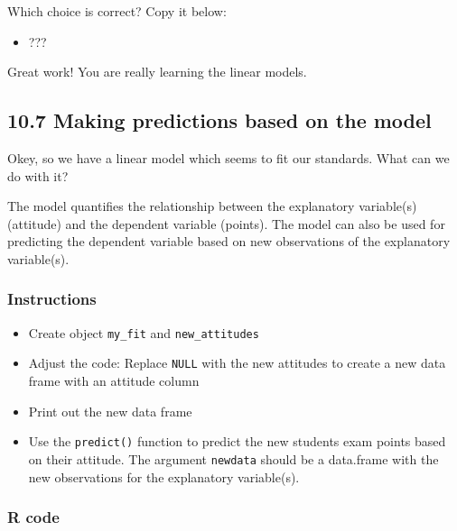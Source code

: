 \documentclass[]{article}
\providecommand{\tightlist}{%
  \setlength{\itemsep}{0pt}\setlength{\parskip}{0pt}}
\begin{document}
Which choice is correct? Copy it below:

\begin{itemize}
\tightlist
\item
  ???
\end{itemize}

Great work! You are really learning the linear models.

\hypertarget{making-predictions-based-on-the-model}{%
\subsection{10.7 Making predictions based on the
model}\label{making-predictions-based-on-the-model}}

Okey, so we have a linear model which seems to fit our standards. What
can we do with it?

The model quantifies the relationship between the explanatory
variable(s) (attitude) and the dependent variable (points). The model
can also be used for predicting the dependent variable based on new
observations of the explanatory variable(s).

\hypertarget{instructions-6}{%
\subsubsection{Instructions}\label{instructions-6}}

\begin{itemize}
\tightlist
\item
  Create object \texttt{my\_fit} and \texttt{new\_attitudes}
\item
  Adjust the code: Replace \texttt{NULL} with the new attitudes to
  create a new data frame with an attitude column
\item
  Print out the new data frame
\item
  Use the \texttt{predict()} function to predict the new students exam
  points based on their attitude. The argument \texttt{newdata} should
  be a data.frame with the new observations for the explanatory
  variable(s).
\end{itemize}

\hypertarget{r-code-4}{%
\subsubsection{R code}\label{r-code-4}}
\end{document}
